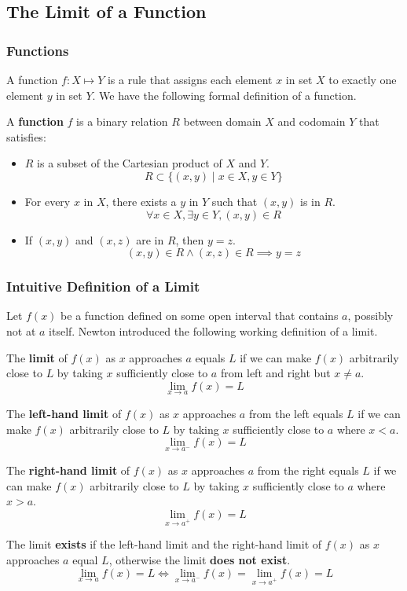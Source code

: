 \subsection{The Limit of a Function}

\subsubsection{Functions}
A function \(f:X\mapsto Y\) is a rule that assigns each element \(x\) in set
\(X\) to exactly one element \(y\) in set \(Y\).
We have the following formal definition of a function.
\begin{definition}
    A \textbf{function} \(f\) is a binary relation \(R\) between domain \(X\)
    and codomain \(Y\) that satisfies:
    \begin{itemize}
        \item \(R\) is a subset of the Cartesian product of \(X\) and \(Y\).
        \[R\subset\{(x,y)\mid x\in X,y\in Y\}\]
        \item For every \(x\) in \(X\), there exists a \(y\) in \(Y\) such
        that \((x,y)\) is in \(R\).
        \[\forall x\in X,\exists y\in Y,(x,y)\in R\]
        \item If \((x,y)\) and \((x,z)\) are in \(R\), then \(y=z\).
        \[(x,y)\in R \wedge (x,z)\in R \implies y=z\]
    \end{itemize}
\end{definition}

\subsubsection{Intuitive Definition of a Limit}
Let \(f(x)\) be a function defined on some open interval that contains \(a\),
possibly not at \(a\) itself.
Newton introduced the following working definition of a limit.
\begin{definition}
    The \textbf{limit} of \(f(x)\) as \(x\) approaches \(a\) equals \(L\) if
    we can make \(f(x)\) arbitrarily close to \(L\) by taking \(x\)
    sufficiently close to \(a\) from left and right but \(x\neq a\).
    \[\lim_{x\to a}f(x)=L\]
\end{definition}
\begin{definition}
    The \textbf{left-hand limit} of \(f(x)\) as \(x\) approaches \(a\) from
    the left equals \(L\) if we can make \(f(x)\) arbitrarily close to \(L\)
    by taking \(x\) sufficiently close to \(a\) where \(x<a\).
    \[\lim_{x\to a^-}f(x)=L\]
\end{definition}
\begin{definition}
    The \textbf{right-hand limit} of \(f(x)\) as \(x\) approaches \(a\) from
    the right equals \(L\) if we can make \(f(x)\) arbitrarily close to \(L\)
    by taking \(x\) sufficiently close to \(a\) where \(x>a\).
    \[\lim_{x\to a^+}f(x)=L\]
\end{definition}
The limit \textbf{exists} if the left-hand limit and the right-hand limit of
\(f(x)\) as \(x\) approaches \(a\) equal \(L\), otherwise the limit
\textbf{does not exist}.
\[\lim_{x\to a}f(x)=L\iff \lim_{x\to a^-}f(x)=\lim_{x\to a^+}f(x)=L\]